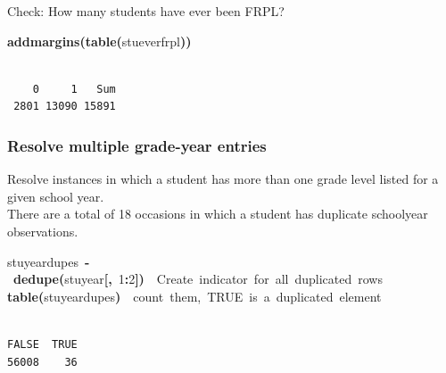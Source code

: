 \documentclass[12pt]{article}
\makeatletter
\newcommand{\hlnumber}[1]{\textcolor[rgb]{0,0,0}{#1}}%
\newcommand{\hlfunctioncall}[1]{\textcolor[rgb]{0.501960784313725,0,0.329411764705882}{\textbf{#1}}}%
\newcommand{\hlkeyword}[1]{\textcolor[rgb]{0,0,0}{\textbf{#1}}}%
\newcommand{\hlcomment}[1]{\textcolor[rgb]{0.180392156862745,0.6,0.341176470588235}{#1}}%
\newcommand{\hlassignement}[1]{\textcolor[rgb]{0,0,0}{\textbf{#1}}}%
\newcommand{\hlsymbol}[1]{\textcolor[rgb]{0,0,0}{#1}}%
\newcommand{\hlstd}[1]{\textcolor[rgb]{0,0,0}{#1}}%
\newenvironment{kframe}{%
 \def\FrameCommand##1{\hskip\@totalleftmargin \hskip-\fboxsep
 \colorbox{shadecolor}{##1}\hskip-\fboxsep
     \hskip-\linewidth \hskip-\@totalleftmargin \hskip\columnwidth}%
 \MakeFramed {\advance\hsize-\width
   \@totalleftmargin\z@ \linewidth\hsize
   \@setminipage}}%
 {\par\unskip\endMakeFramed}
\newenvironment{knitrout}{}{} %
\renewenvironment{knitrout}{\begin{footnotesize}}{\end{footnotesize}}
\makeatother
\begin{document}
Check: How many students have ever been FRPL?

\begin{knitrout}
\color{fgcolor}\begin{kframe}
\begin{flushleft}
\ttfamily\noindent
\hlfunctioncall{addmargins}\hlkeyword{(}\hlfunctioncall{table}\hlkeyword{(}\hlsymbol{stu}\hlkeyword{\usebox{\hlnormalsizeboxdollar}}\hlsymbol{ever\usebox{\hlnormalsizeboxunderscore}frpl}\hlkeyword{)}\hlkeyword{)}\mbox{}
\normalfont
\end{flushleft}
\begin{verbatim}

    0     1   Sum 
 2801 13090 15891 
\end{verbatim}
\end{kframe}
\end{knitrout}


\subsubsection{Resolve multiple grade-year entries}
Resolve instances in which a student has more than one grade level listed for a given school year.\\

There are a total of 18 occasions in which a student has duplicate schoolyear observations. 


\begin{knitrout}
\color{fgcolor}\begin{kframe}
\begin{flushleft}
\ttfamily\noindent
\hlsymbol{stuyear}\hlkeyword{\usebox{\hlnormalsizeboxdollar}}\hlsymbol{dupes}{\ }\hlassignement{\usebox{\hlnormalsizeboxlessthan}-}{\ }\hlfunctioncall{dedupe}\hlkeyword{(}\hlsymbol{stuyear}\hlkeyword{[}\hlkeyword{,}{\ }\hlnumber{1}\hlkeyword{:}\hlnumber{2}\hlkeyword{]}\hlkeyword{)}{\ }{\ }\hlcomment{\usebox{\hlnormalsizeboxhash}{\ }Create{\ }indicator{\ }for{\ }all{\ }duplicated{\ }rows}\hspace*{\fill}\\
\hlstd{}\hlfunctioncall{table}\hlkeyword{(}\hlsymbol{stuyear}\hlkeyword{\usebox{\hlnormalsizeboxdollar}}\hlsymbol{dupes}\hlkeyword{)}{\ }{\ }\hlcomment{\usebox{\hlnormalsizeboxhash}{\ }count{\ }them,{\ }TRUE{\ }is{\ }a{\ }duplicated{\ }element}\mbox{}
\normalfont
\end{flushleft}
\begin{verbatim}

FALSE  TRUE 
56008    36 
\end{verbatim}
\end{kframe}
\end{knitrout}
\end{document}
